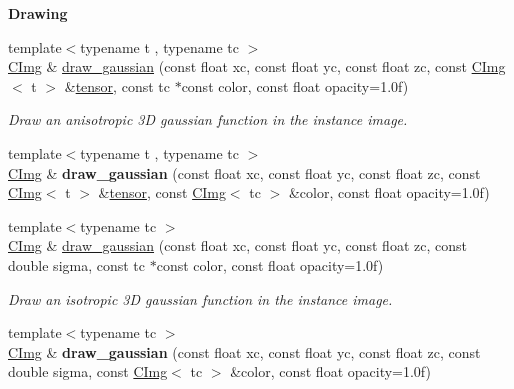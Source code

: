 \begin{Indent}{\bf Drawing}
\begin{DoxyCompactItemize}
\item 
{\footnotesize template$<$typename t , typename tc $>$ }\\\hyperlink{structcimg__library_1_1_c_img}{C\-Img} \& \hyperlink{structcimg__library_1_1_c_img_a046727fc99590f3d7900c0600c8eb7fa}{draw\-\_\-gaussian} (const float xc, const float yc, const float zc, const \hyperlink{structcimg__library_1_1_c_img}{C\-Img}$<$ t $>$ \&\hyperlink{structcimg__library_1_1_c_img_a40bd4344f4a7aae588ef5bfa4f8861d1}{tensor}, const tc $\ast$const color, const float opacity=1.\-0f)
\begin{DoxyCompactList}\small\item\em Draw an anisotropic 3\-D gaussian function in the instance image. \end{DoxyCompactList}\item 
\hypertarget{structcimg__library_1_1_c_img_ae8cf4a7ffa74ad94e577dd9743900daf}{{\footnotesize template$<$typename t , typename tc $>$ }\\\hyperlink{structcimg__library_1_1_c_img}{C\-Img} \& {\bfseries draw\-\_\-gaussian} (const float xc, const float yc, const float zc, const \hyperlink{structcimg__library_1_1_c_img}{C\-Img}$<$ t $>$ \&\hyperlink{structcimg__library_1_1_c_img_a40bd4344f4a7aae588ef5bfa4f8861d1}{tensor}, const \hyperlink{structcimg__library_1_1_c_img}{C\-Img}$<$ tc $>$ \&color, const float opacity=1.\-0f)}\label{structcimg__library_1_1_c_img_ae8cf4a7ffa74ad94e577dd9743900daf}

\item 
{\footnotesize template$<$typename tc $>$ }\\\hyperlink{structcimg__library_1_1_c_img}{C\-Img} \& \hyperlink{structcimg__library_1_1_c_img_aadeb1905d8c1e1c95576ff1da708aa78}{draw\-\_\-gaussian} (const float xc, const float yc, const float zc, const double sigma, const tc $\ast$const color, const float opacity=1.\-0f)
\begin{DoxyCompactList}\small\item\em Draw an isotropic 3\-D gaussian function in the instance image. \end{DoxyCompactList}\item 
\hypertarget{structcimg__library_1_1_c_img_ad9d549719ff9b49188801931c5ca7a50}{{\footnotesize template$<$typename tc $>$ }\\\hyperlink{structcimg__library_1_1_c_img}{C\-Img} \& {\bfseries draw\-\_\-gaussian} (const float xc, const float yc, const float zc, const double sigma, const \hyperlink{structcimg__library_1_1_c_img}{C\-Img}$<$ tc $>$ \&color, const float opacity=1.\-0f)}\label{structcimg__library_1_1_c_img_ad9d549719ff9b49188801931c5ca7a50}


\end{DoxyCompactItemize}
\end{Indent}
